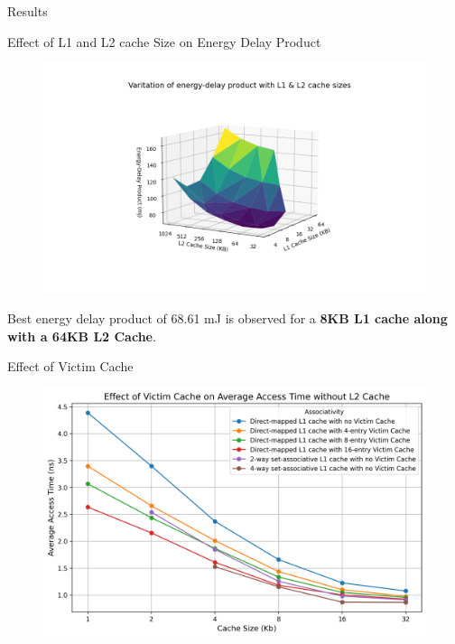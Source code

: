 \begin{section}{Results}
\begin{subsection}{Effect of L1 and L2 cache Size on Energy Delay Product}
        \begin{figure}[h]
            \includegraphics[width=\textwidth]{figures/fig6/fig6.png}
            \centering
            \label{fig:fig6}
        \end{figure}
    
        Best energy delay product of 68.61 mJ is observed for a \textbf{8KB L1 cache along with a 64KB L2 Cache}.
        
    \end{subsection}
   
    \begin{subsection}{Effect of Victim Cache}


        \begin{figure}[h]
            \includegraphics[width=\textwidth]{figures/fig7/fig7.png}
            \centering
            \label{fig:fig7}
        \end{figure}
        
    \end{subsection}

\end{section}